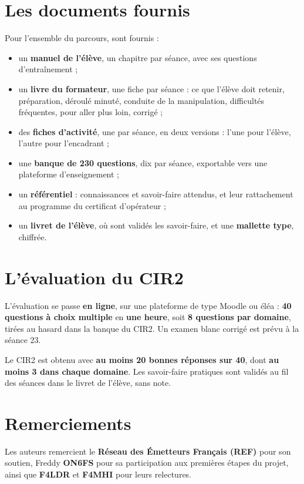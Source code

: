 \documentclass[11pt,a4paper]{article}
\begin{document}
\section{Les documents fournis}

Pour l'ensemble du parcours, sont fournis :
\begin{itemize}
  \item un \textbf{manuel de l'élève}, un chapitre par séance, avec ses
    questions d'entraînement ;
  \item un \textbf{livre du formateur}, une fiche par séance : ce que l'élève
    doit retenir, préparation, déroulé minuté, conduite de la manipulation,
    difficultés fréquentes, pour aller plus loin, corrigé ;
  \item des \textbf{fiches d'activité}, une par séance, en deux versions :
    l'une pour l'élève, l'autre pour l'encadrant ;
  \item une \textbf{banque de 230 questions}, dix par séance, exportable vers
    une plateforme d'enseignement ;
  \item un \textbf{référentiel} : connaissances et savoir-faire attendus, et
    leur rattachement au programme du certificat d'opérateur ;
  \item un \textbf{livret de l'élève}, où sont validés les savoir-faire, et
    une \textbf{mallette type}, chiffrée.
\end{itemize}

\section{L'évaluation du CIR2}

L'évaluation se passe \textbf{en ligne}, sur une plateforme de type Moodle ou
éléa : \textbf{40 questions à choix multiple} en \textbf{une heure}, soit
\textbf{8 questions par domaine}, tirées au hasard dans la banque du CIR2. Un
examen blanc corrigé est prévu à la séance 23.

Le CIR2 est obtenu avec \textbf{au moins 20 bonnes réponses sur 40}, dont
\textbf{au moins 3 dans chaque domaine}. Les savoir-faire pratiques sont
validés au fil des séances dans le livret de l'élève, sans note.

\section{Remerciements}

Les auteurs remercient le \textbf{Réseau des Émetteurs Français (REF)} pour
son soutien, Freddy \textbf{ON6FS} pour sa participation aux premières étapes
du projet, ainsi que \textbf{F4LDR} et \textbf{F4MHI} pour leurs relectures.
\end{document}
